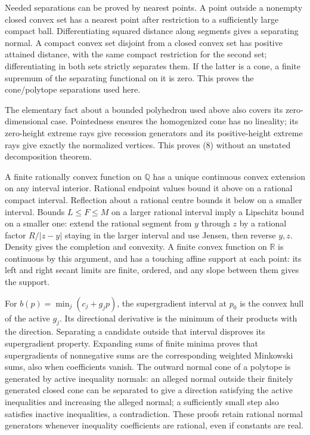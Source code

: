 \documentclass[
  11pt,
]{article}
\begin{document}
Needed separations can be proved by nearest points. A point outside a
nonempty closed convex set has a nearest point after restriction to a
sufficiently large compact ball. Differentiating squared distance along
segments gives a separating normal. A compact convex set disjoint from a
closed convex set has positive attained distance, with the same compact
restriction for the second set; differentiating in both sets strictly
separates them. If the latter is a cone, a finite supremum of the
separating functional on it is zero. This proves the cone/polytope
separations used here.

The elementary fact about a bounded polyhedron used above also covers
its zero-dimensional case. Pointedness ensures the homogenized cone has
no lineality; its zero-height extreme rays give recession generators and
its positive-height extreme rays give exactly the normalized vertices.
This proves (8) without an unstated decomposition theorem.

A finite rationally convex function on \(\mathbb{Q}\) has a unique
continuous convex extension on any interval interior. Rational endpoint
values bound it above on a rational compact interval. Reflection about a
rational centre bounds it below on a smaller interval. Bounds
\(L\leq F\leq M\) on a larger rational interval imply a Lipschitz bound
on a smaller one: extend the rational segment from \(y\) through \(z\)
by a rational factor \(R/|z-y|\) staying in the larger interval and use
Jensen, then reverse \(y,z\). Density gives the completion and
convexity. A finite convex function on \(\mathbb{R}\) is continuous by
this argument, and has a touching affine support at each point: its left
and right secant limits are finite, ordered, and any slope between them
gives the support.

For \(b(p)=\min_j(c_j+g_jp)\), the supergradient interval at \(p_0\) is
the convex hull of the active \(g_j\). Its directional derivative is the
minimum of their products with the direction. Separating a candidate
outside that interval disproves its supergradient property. Expanding
sums of finite minima proves that supergradients of nonnegative sums are
the corresponding weighted Minkowski sums, also when coefficients
vanish. The outward normal cone of a polytope is generated by active
inequality normals: an alleged normal outside their finitely generated
closed cone can be separated to give a direction satisfying the active
inequalities and increasing the alleged normal; a sufficiently small
step also satisfies inactive inequalities, a contradiction. These proofs
retain rational normal generators whenever inequality coefficients are
rational, even if constants are real.
\end{document}
